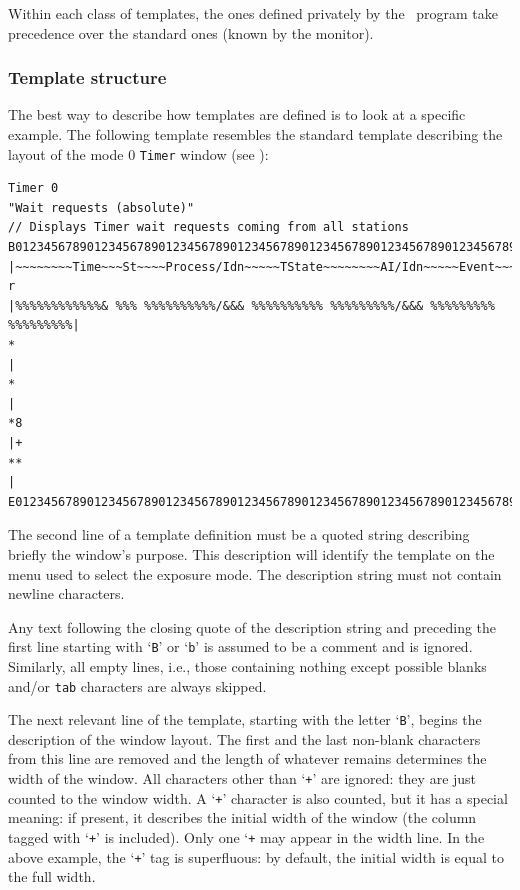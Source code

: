 Within each class of templates, the ones defined privately by the
\smurph\ program 
take precedence over the standard ones (known by the monitor).

\subsubsection{Template structure}
\label{rm_ds_tp_ts}

The best way to describe how templates are defined is to look at a
specific example.
The following template resembles the standard template describing the layout of
the mode 0 {\tt Timer} window (see ):

{\small
\begin{verbatim}
Timer 0
"Wait requests (absolute)"
// Displays Timer wait requests coming from all stations
B0123456789012345678901234567890123456789012345678901234567890123456789012345+B
|~~~~~~~~Time~~~St~~~~Process/Idn~~~~~TState~~~~~~~~AI/Idn~~~~~Event~~~~~State| r
|%%%%%%%%%%%%& %%% %%%%%%%%%%/&&& %%%%%%%%%% %%%%%%%%%/&&& %%%%%%%%% %%%%%%%%%|
*                                                                             |
*                                                                             | 
*8                                                                            |+
**                                                                            |
E01234567890123456789012345678901234567890123456789012345678901234567890123456E
\end{verbatim}}

The second line of a template definition must be a quoted string describing
briefly the window's purpose.
This description will identify the template on the menu used to 
select the exposure mode.
The description string must not contain newline characters.

Any text following the closing quote of the
description string and preceding the first
line starting with `{\tt B}' or `{\tt b}' is
assumed to be a comment and is ignored.
Similarly, all empty lines, i.e.,
those containing nothing except possible blanks and/or {\tt tab} characters
are always skipped.

The next relevant
line of the template,
starting with the letter `{\tt B}', begins the description of the window layout.
The first and the last non-blank characters from this line are removed and the
length of whatever remains determines the width of the window.
All characters other than `{\tt +}'
are ignored: they are just counted to the window width.
A `{\tt +}' character is also counted, but it has a
special meaning: if present, it describes the initial width of the window
(the column tagged with `{\tt +}' is included).
Only one `{\tt +} may appear in the width line.
In the above example, the `{\tt +}' tag is superfluous: by default, the
initial width is equal to the full width.

